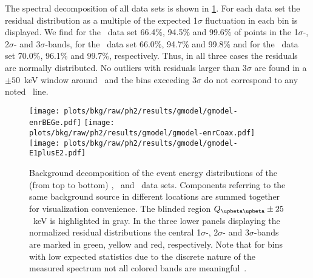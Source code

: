 The spectral decomposition of all data sets is shown in
\cref{fig:bkg:raw:ph2:gmodel:plotresults}. For each data set the residual distribution as
a multiple of the expected 1$\sigma$ fluctuation in each bin is
displayed. We find for the \enrBEGeII\ data set 66.4\%, 94.5\% and 99.6\%
of points in the 1$\sigma$-, 2$\sigma$- and 3$\sigma$-bands, for the
\enrCoaxII\ data set 66.0\%, 94.7\% and 99.8\% and for the \enrGeII\ data
set 70.0\%, 96.1\% and 99.7\%, respectively. Thus, in all three cases
the residuals are normally distributed. No outliers with residuals
larger than $3\sigma$ are found in a $\pm50$~keV window around \qbb\ and
the bins exceeding $3\sigma$ do not correspond to any noted
\g\ line.

\begin{figure}[tb]
  \centering
  \texttt{[image: plots/bkg/raw/ph2/results/gmodel/gmodel-enrBEGe.pdf]}
  \texttt{[image: plots/bkg/raw/ph2/results/gmodel/gmodel-enrCoax.pdf]}
  \texttt{[image: plots/bkg/raw/ph2/results/gmodel/gmodel-E1plusE2.pdf]}
  \caption{%
    Background decomposition of the event energy distributions of the (from top to bottom)
    \enrBEGeII, \enrCoaxII\ and \enrGeII\ data sets.  Components referring to the same
    background source in different locations are summed together for visualization
    convenience. The blinded region $\qbbM \pm 25$~keV is highlighted in gray. In the
    three lower panels displaying the normalized residual distributions the central
    1$\sigma$-, 2$\sigma$- and 3$\sigma$-bands are marked in green, yellow and red,
    respectively. Note that for bins with low expected statistics due to the discrete
    nature of the measured spectrum not all colored bands are
    meaningful~\cite{Aggarwal2011}.%
  }\label{fig:bkg:raw:ph2:gmodel:plotresults}
\end{figure}

